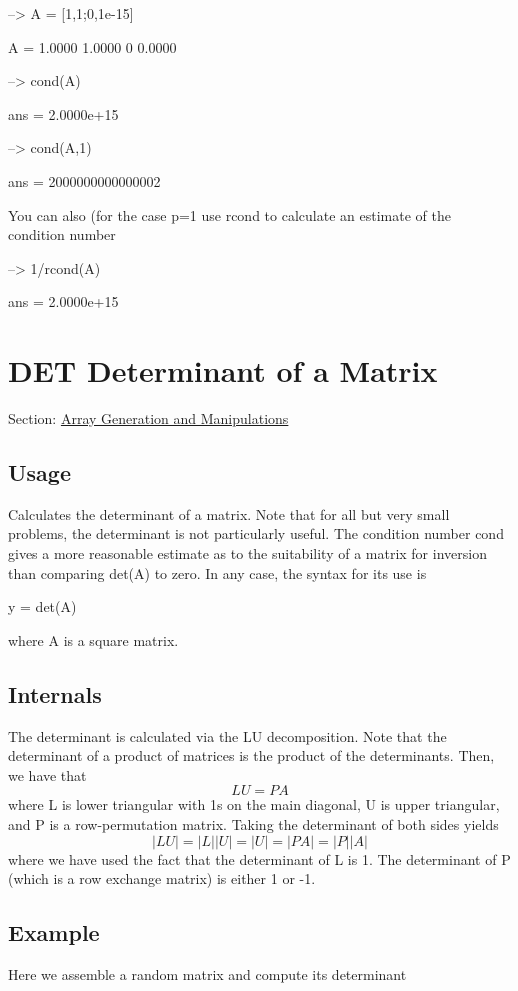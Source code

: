 \begin{DoxyVerbInclude}
--> A = [1,1;0,1e-15]

A = 
    1.0000    1.0000 
         0    0.0000 

--> cond(A)

ans = 
 2.0000e+15 

--> cond(A,1)

ans = 
 2000000000000002 
\end{DoxyVerbInclude}


You can also (for the case {\ttfamily p=1} use {\ttfamily rcond} to calculate an estimate of the condition number


\begin{DoxyVerbInclude}
--> 1/rcond(A)

ans = 
 2.0000e+15 
\end{DoxyVerbInclude}
 \hypertarget{array_det}{}\section{D\-E\-T Determinant of a Matrix}\label{array_det}
Section\-: \hyperlink{sec_array}{Array Generation and Manipulations} \hypertarget{vtkwidgets_vtkxyplotwidget_Usage}{}\subsection{Usage}\label{vtkwidgets_vtkxyplotwidget_Usage}
Calculates the determinant of a matrix. Note that for all but very small problems, the determinant is not particularly useful. The condition number {\ttfamily cond} gives a more reasonable estimate as to the suitability of a matrix for inversion than comparing {\ttfamily det(\-A)} to zero. In any case, the syntax for its use is \begin{DoxyVerb}  y = det(A)
\end{DoxyVerb}
 where A is a square matrix. \hypertarget{transforms_svd_Function}{}\subsection{Internals}\label{transforms_svd_Function}
The determinant is calculated via the {\ttfamily L\-U} decomposition. Note that the determinant of a product of matrices is the product of the determinants. Then, we have that \[ L U = P A \] where {\ttfamily L} is lower triangular with 1s on the main diagonal, {\ttfamily U} is upper triangular, and {\ttfamily P} is a row-\/permutation matrix. Taking the determinant of both sides yields \[ |L U| = |L| |U| = |U| = |P A| = |P| |A| \] where we have used the fact that the determinant of {\ttfamily L} is 1. The determinant of {\ttfamily P} (which is a row exchange matrix) is either 1 or -\/1. \hypertarget{variables_struct_Example}{}\subsection{Example}\label{variables_struct_Example}
Here we assemble a random matrix and compute its determinant


